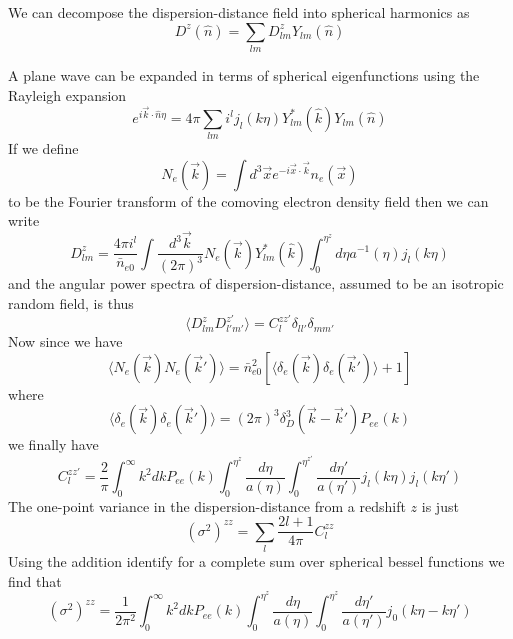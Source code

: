 \documentclass[twocolumn,prd,noshowpacs,nofootinbib,amsmath,amssymb]{revtex4}
\begin{document}
We can decompose the dispersion-distance field into spherical harmonics as
\begin{equation}
D^z(\hat{n}) = \sum_{l m} D^z_{l m} Y_{l m} (\hat{n})
\end{equation}

A plane wave can be expanded in terms of spherical eigenfunctions using the Rayleigh expansion
\begin{equation}
e^{i \vec{k}\cdot \hat{n} \eta} = 4\pi \sum_{l m} i^l j_{l}(k\eta) Y^*_{lm}(\hat{k})Y_{lm}(\hat{n})
\end{equation}
If we define 
\begin{equation}
N_e(\vec{k}) = \int d^3 \vec{x} e^{-i \vec{x}\cdot\vec{k}} n_e(\vec{x})
\end{equation}
to be the Fourier transform of the comoving electron density field then we can write
\begin{equation}
D^z_{l m} = \frac{4 \pi i^{l}}{\bar{n}_{e0}} \int \frac{d^3 \vec{k}}{(2\pi)^3} N_e(\vec{k}) Y^*_{l m}(\hat{k}) \int_0^{\eta^z} d\eta a^{-1}(\eta) j_{l}(k\eta)
\end{equation}
and the angular power spectra of dispersion-distance, assumed to be an isotropic random field, is thus
\begin{equation}
\langle D^z_{l m} D^{z'}_{l' m'} \rangle = C_l^{z z'} \delta_{l l'} \delta_{m m'}
\end{equation}
Now since we have 
\begin{equation}
\langle N_e(\vec{k}) N_e(\vec{k}')\rangle = \bar{n}_{e0}^2\left[\langle \delta_e(\vec{k})\delta_e(\vec{k}')\rangle + 1 \right]
\end{equation}
where
\begin{equation}
\langle \delta_e(\vec{k})\delta_e(\vec{k}')\rangle = (2\pi)^3 \delta_{D}^3(\vec{k}-\vec{k}') P_{ee}(k)
\end{equation}
we finally have
\begin{equation}
C_l^{zz'}=\frac{2}{\pi} \int_0^{\infty}k^2 dk P_{ee}(k) \int_0^{\eta^z}\frac{d\eta}{a(\eta)} \int_0^{\eta^{z'}}\frac{d\eta'}{a(\eta')}  j_l(k\eta) j_l(k\eta')
\end{equation}
The one-point variance in the dispersion-distance from a redshift $z$ is just
\begin{equation}
(\sigma^2)^{zz}=\sum_{l} \frac{2l+1}{4\pi} C_l^{zz}
\end{equation}
Using the addition identify for a complete sum over spherical bessel functions we find that
\begin{equation}
(\sigma^2)^{zz}= \frac{1}{2\pi^2} \int_0^{\infty}k^2 dk P_{ee}(k) \int_0^{\eta^z}\frac{d\eta}{a(\eta)} \int_0^{\eta^{z}}\frac{d\eta'}{a(\eta')}  j_0(k\eta-k\eta')
\end{equation}
\end{document}
